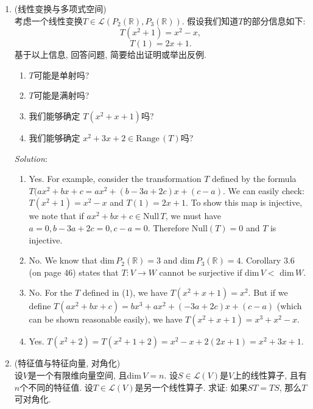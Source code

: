 \documentclass[a4paper]{article}
\newcommand\R{\mathbb{R}}  %
\begin{document}
\begin{enumerate}
	\item (线性变换与多项式空间)\\
	考虑一个线性变换$T \in \mathcal{L}(P_{2}(\R), P_{3} (\R))$. 假设我们知道$T$的部分信息如下:
	\[
	T(x^2+1) = x^2 - x,
	\]
	\[
	T(1) = 2x + 1.
	\]
	基于以上信息, 回答问题, 简要给出证明或举出反例.
	\begin{enumerate}[(1)]
		\item $T$可能是单射吗?
		\item $T$可能是满射吗?
		\item 我们能够确定 $T(x^2 + x + 1)$吗? 
		\item 我们能够确定 $x^2 + 3x + 2 \in \mathrm{Range}\,(T)$吗?
	\end{enumerate}

	\emph{Solution}:
	\begin{enumerate}[(1)]
		\item Yes. For example, consider the transformation $T$ defined by the formula $T(ax^2 + bx + c = ax^2 + (b - 3a + 2c) x + (c - a)$. We can easily check: $T(x^2+1) = x^2 - x$ and $T(1) = 2x + 1$. To show this map is injective, we note that if $ax^2 + bx + c \in \mathrm{Null}\,T$, we must have $a=0, b - 3a + 2c = 0, c - a = 0$. Therefore $\mathrm{Null}(T) = 0$ and $T$ is injective.
		\item No. We know that dim$\,P_2(\R) = 3$ and dim$\,P_3(\R) = 4$. Corollary 3.6 (on page 46) states that $T: V \to W$ cannot be surjective if dim$\, V <$ dim$\, W$.
		\item No. For the $T$ defined in (1), we have $T(x^2 +x+1) = x^2$. But if we define $T(ax^2 +bx+c) = bx^3 +ax^2 + (-3a+2c)x + (c - a)$ (which can be shown reasonable easily), we have $T(x^2 + x +1) = x^3 + x^2 - x$.
		\item Yes. $T(x^2 + 2) = T(x^2 +1 + 2) = x^2 - x + 2(2x + 1) = x^2+3x+1$.
	\end{enumerate}
	
	
	\item (特征值与特征向量, 对角化)\\
	设$V$是一个有限维向量空间, 且dim$\,V = n$. 设$S \in \mathcal{L}(V)$是$V$上的线性算子, 且有$n$个不同的特征值. 设$T \in \mathcal{L}(V)$是另一个线性算子. 求证: 如果$ST = TS$, 那么$T$ 可对角化.


\end{enumerate}
\end{document}
